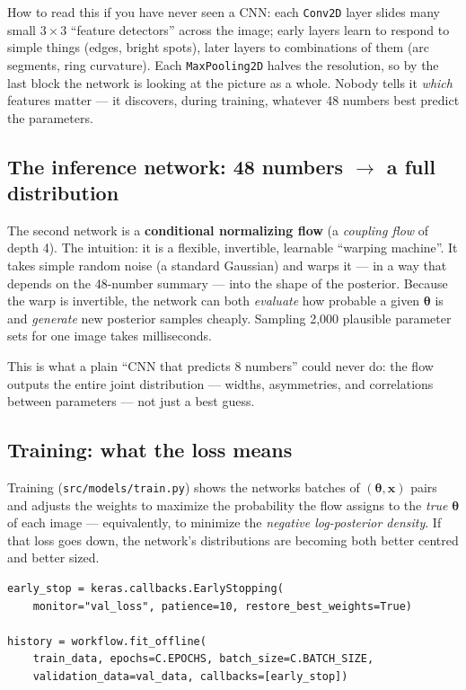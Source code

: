 \documentclass[11pt,a4paper]{article}
\begin{document}
How to read this if you have never seen a CNN: each \texttt{Conv2D} layer slides
many small $3\times3$ ``feature detectors'' across the image; early layers learn
to respond to simple things (edges, bright spots), later layers to combinations
of them (arc segments, ring curvature). Each \texttt{MaxPooling2D} halves the
resolution, so by the last block the network is looking at the picture as a whole.
Nobody tells it \emph{which} features matter --- it discovers, during training,
whatever 48 numbers best predict the parameters.

\subsection{The inference network: 48 numbers $\rightarrow$ a full distribution}

The second network is a \textbf{conditional normalizing flow} (a
\emph{coupling flow} of depth 4). The intuition: it is a flexible, invertible,
learnable ``warping machine''. It takes simple random noise (a standard Gaussian)
and warps it --- in a way that depends on the 48-number summary --- into the shape
of the posterior. Because the warp is invertible, the network can both
\emph{evaluate} how probable a given $\boldsymbol\theta$ is and \emph{generate}
new posterior samples cheaply. Sampling 2{,}000 plausible parameter sets for one
image takes milliseconds.

This is what a plain ``CNN that predicts 8 numbers'' could never do: the flow
outputs the entire joint distribution --- widths, asymmetries, and correlations
between parameters --- not just a best guess.

\subsection{Training: what the loss means}

Training (\texttt{src/models/train.py}) shows the networks batches of
$(\boldsymbol\theta, \mathbf{x})$ pairs and adjusts the weights to maximize the
probability the flow assigns to the \emph{true} $\boldsymbol\theta$ of each image
--- equivalently, to minimize the \emph{negative log-posterior density}. If that
loss goes down, the network's distributions are becoming both better centred and
better sized.

\begin{lstlisting}
early_stop = keras.callbacks.EarlyStopping(
    monitor="val_loss", patience=10, restore_best_weights=True)

history = workflow.fit_offline(
    train_data, epochs=C.EPOCHS, batch_size=C.BATCH_SIZE,
    validation_data=val_data, callbacks=[early_stop])
\end{lstlisting}
\end{document}
